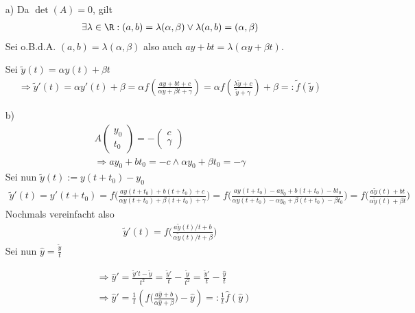 \begin{solution}
\begin{itemize}
  \item[a)]
  Da $\det(A) = 0$, gilt
  \begin{align*}
    \exists \lambda \in \R: (a,b) = \lambda (\alpha, \beta) \lor \lambda (a,b) = (\alpha, \beta)
  \end{align*}
  Sei o.B.d.A. $(a,b) = \lambda (\alpha, \beta)$ also auch $ay + bt = \lambda (\alpha y + \beta t)$.

  Sei $\tilde{y}(t) = \alpha y(t) + \beta t$
  \begin{align*}
    \Rightarrow \tilde{y}'(t) = \alpha y'(t) + \beta = \alpha f(\frac{ay + bt + c}{\alpha y + \beta t + \gamma}) = \alpha f(\frac{\lambda \tilde{y} + c}{\tilde{y} + \gamma}) + \beta =: \tilde{f}(\tilde{y})
  \end{align*}

  \item[b)]
  \begin{align*}
    A\left(
    \begin{array}{c}
      y_0 \\
      t_0
    \end{array}
    \right) = -\left(
    \begin{array}{c}
      c \\
      \gamma
    \end{array}
    \right) \\
    \Rightarrow ay_0 + bt_0 = -c \land \alpha y_0 + \beta t_0 = -\gamma
  \end{align*}
  Sei nun $\tilde{y}(t) := y(t + t_0 ) - y_0$
  \begin{align*}
    \tilde{y}'(t) = y'(t + t_0 ) = f \bigg(\frac{ay(t+t_0) + b(t+t_0) + c}{\alpha y(t+t_0) + \beta (t+t_0) + \gamma}\bigg) = f\bigg(\frac{ay(t+t_0) - ay_0 + b(t+t_0) - bt_0}{\alpha y(t+t_0) -\alpha y_0 + \beta (t+t_0) - \beta t_0}
    \bigg) = f \bigg(\frac{a\tilde{y}(t) + bt}{\alpha \tilde{y}(t) + \beta t}\bigg)
  \end{align*}
  Nochmals vereinfacht also
  \begin{align*}
    \tilde{y}'(t) = f \bigg(\frac{a\tilde{y}(t)/t + b}{\alpha \tilde{y}(t)/t + \beta }\bigg)
  \end{align*}
  Sei nun $\hat{y} = \frac{\tilde{y}}{t}$

  \begin{align*}
    &\Rightarrow \hat{y}' = \frac{\tilde{y}' t - \tilde{y}}{t^{2}} = \frac{\tilde{y}'}{t} - \frac{\tilde{y}}{t^{2}} = \frac{\tilde{y}'}{t} - \frac{\hat{y}}{t} \\
    &\Rightarrow \hat{y}' = \frac{1}{t} (f \bigg(\frac{a\hat{y} + b}{\alpha \hat{y} + \beta }\bigg) - \hat{y}) =: \frac{1}{t} \hat{f}(\hat{y})
  \end{align*}
\end{itemize}
\end{solution}
